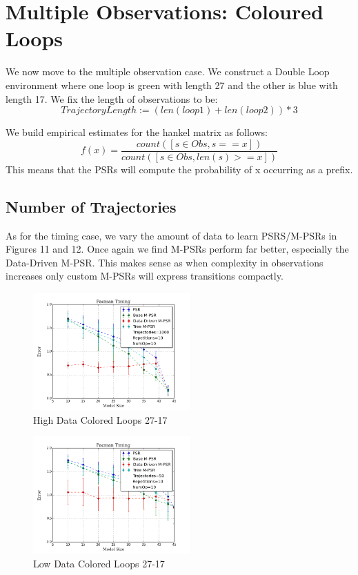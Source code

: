 \section{Multiple Observations: Coloured Loops}

We now move to the multiple observation case. We construct a Double Loop environment where one loop is green with length 27 and the other is blue with length 17. We fix the length of observations to be:
\begin{equation*}
TrajectoryLength := (len(loop1) + len(loop2))*3
\end{equation*} 

We build empirical estimates for the hankel matrix as follows:
\begin{equation*}
 f(x)=\dfrac{count([s \in Obs, s==x])}{count([s \in Obs, len(s)>=x])}
\end{equation*}  
This means that the PSRs will compute the probability of x occurring as a prefix.

\subsection{Number of Trajectories}

As for the timing case, we vary the amount of data to learn PSRS/M-PSRs in Figures 11 and 12. Once again we find M-PSRs perform far better, especially the Data-Driven M-PSR. This makes sense as when complexity in observations increases only custom M-PSRs will express transitions compactly.

\begin{figure}[ht!]
\centering
\includegraphics[width=60mm]{uCOREPICS/DLMO/MO_1k.png}
\caption{High Data Colored Loops 27-17\label{overflow}}
\end{figure}

\begin{figure}[ht!]
\centering
\includegraphics[width=60mm]{uCOREPICS/DLMO/MO_50.png}
\caption{Low Data Colored Loops 27-17\label{overflow}}
\end{figure}

